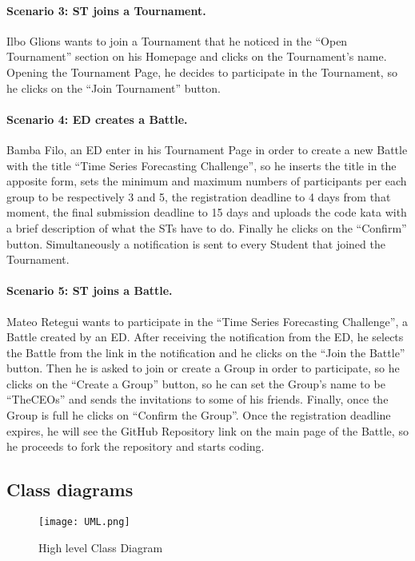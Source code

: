 \paragraph{Scenario 3: ST joins a Tournament.}
Ilbo Glions wants to join a Tournament that he noticed in the “Open Tournament” section on his Homepage and clicks on the Tournament’s name. Opening the Tournament Page, he decides to participate in the Tournament, so he clicks on the “Join Tournament” button. 

\paragraph{Scenario 4: ED creates a Battle.}
Bamba Filo, an ED enter in his Tournament Page in order to create a new Battle with the title “Time Series Forecasting Challenge”, so he inserts the title in the apposite form, sets the minimum and maximum numbers of participants per each group to be respectively 3 and 5, the registration deadline to 4 days from that moment, the final submission deadline to 15 days and uploads the code kata with a brief description of what the STs have to do. Finally he clicks on the “Confirm” button. Simultaneously a notification is sent to every Student that joined the Tournament.

\paragraph{Scenario 5: ST joins a Battle.}
Mateo Retegui wants to participate in the “Time Series Forecasting Challenge”, a Battle created by an ED. After receiving the notification from the ED, he selects the Battle from the link in the notification and he clicks on the “Join the Battle” button. Then he is asked to join or create a Group in order to participate, so he clicks on the “Create a Group'' button, so he can set the Group’s name to be “TheCEOs” and sends the invitations to some of his friends. Finally, once the Group is full he clicks on “Confirm the Group”. Once the registration deadline expires, he will see the GitHub Repository link on the main page of the Battle, so he proceeds to fork the repository and starts coding.



\subsection{Class diagrams}
\label{subsec:class_diagrams}%


\begin{figure}[H]
    \begin{center}
        \texttt{[image: UML.png]}
        \caption{High level Class Diagram}
        \label{fig:UML}%
    \end{center}
\end{figure}


